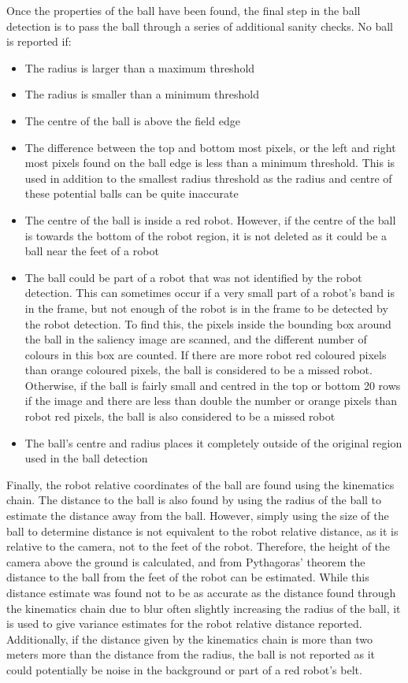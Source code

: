 \documentclass[pdftex,11pt,a4paper]{report}
\begin{document}
Once the properties of the ball have been found, the final step in the ball detection is to pass the ball through a series of additional sanity checks. No ball is reported if: \begin{itemize}
\item{The radius is larger than a maximum threshold}
\item{The radius is smaller than a minimum threshold}
\item{The centre of the ball is above the field edge}
\item{The difference between the top and bottom most pixels, or the left and right most pixels found on the ball edge is less than a minimum threshold. This is used in addition to the smallest radius threshold as the radius and centre of these potential balls can be quite inaccurate}
\item{The centre of the ball is inside a red robot. However, if the centre of the ball is towards the bottom of the robot region, it is not deleted as it could be a ball near the feet of a robot}
\item{The ball could be part of a robot that was not identified by the robot detection. This can sometimes occur if a very small part of a robot's band is in the frame, but not enough of the robot is in the frame to be detected by the robot detection. To find this, the pixels inside the bounding box around the ball in the saliency image are scanned, and the different number of colours in this box are counted. If there are more robot red coloured pixels than orange coloured pixels, the ball is considered to be a missed robot. Otherwise, if the ball is fairly small and centred in the top or bottom 20 rows if the image and there are less than double the number or orange pixels than robot red pixels, the ball is also considered to be a missed robot}
\item{The ball's centre and radius places it completely outside of the original region used in the ball detection}
\end{itemize}
Finally, the robot relative coordinates of the ball are found using the kinematics chain. The distance to the ball is also found by using the radius of the ball to estimate the distance away from the ball. However, simply using the size of the ball to determine distance is not equivalent to the robot relative distance, as it is relative to the camera, not to the feet of the robot. Therefore, the height of the camera above the ground is calculated, and from Pythagoras' theorem the distance to the ball from the feet of the robot can be estimated. While this distance estimate was found not to be as accurate as the distance found through the kinematics chain due to blur often slightly increasing the radius of the ball, it is used to give variance estimates for the robot relative distance reported. Additionally, if the distance given by the kinematics chain is more than two meters more than the distance from the radius, the ball is not reported as it could potentially be noise in the background or part of a red robot's belt.
\end{document}
